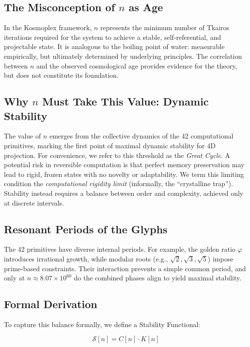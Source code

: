 \documentclass[pdflatex,sn-mathphys-num]{sn-jnl}
\theoremstyle{thmstyleone}
\theoremstyle{thmstyletwo}
\theoremstyle{thmstylethree}
\begin{document}
\subsection{The Misconception of $n$ as Age}\label{subsec:s1-misconception}
In the Kosmoplex framework, $n$ represents the minimum number of Tkairos iterations required for the system to achieve a stable, self-referential, and projectable state. It is analogous to the boiling point of water: measurable empirically, but ultimately determined by underlying principles. The correlation between $n$ and the observed cosmological age provides evidence for the theory, but does not constitute its foundation.

\subsection{Why $n$ Must Take This Value: Dynamic Stability}\label{subsec:s1-dynamic}
The value of $n$ emerges from the collective dynamics of the 42 computational primitives, marking the first point of maximal dynamic stability for 4D projection. For convenience, we refer to this threshold as the \textit{Great Cycle}.
A potential risk in reversible computation is that perfect memory preservation may lead to rigid, frozen states with no novelty or adaptability. We term this limiting condition the \textit{computational rigidity limit} (informally, the ``crystalline trap''). Stability instead requires a balance between order and complexity, achieved only at discrete intervals.

\subsection{Resonant Periods of the Glyphs}\label{subsec:s1-resonant}
The 42 primitives have diverse internal periods. For example, the golden ratio $\varphi$ introduces irrational growth, while modular roots (e.g., $\sqrt{2}, \sqrt{3}, \sqrt{5}$) impose prime-based constraints. Their interaction prevents a simple common period, and only at $n \approx 8.07 \times 10^{60}$ do the combined phases align to yield maximal stability.

\subsection{Formal Derivation}\label{subsec:s1-formal}
To capture this balance formally, we define a Stability Functional:

\begin{equation}
\mathcal{S}[n] = C[n] \cdot K[n]
\end{equation}
\end{document}
